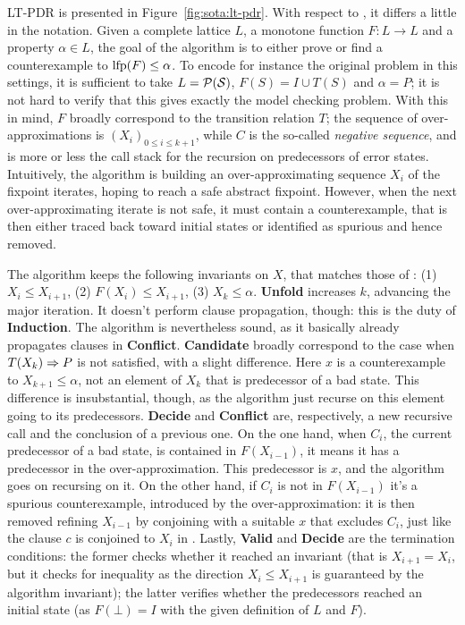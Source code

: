 LT-PDR is presented in Figure~\ref{fig:sota:lt-pdr}. With respect to , it differs a little in the notation. Given a complete lattice $L$, a monotone function $F: L \rightarrow L$ and a property $\alpha \in L$, the goal of the algorithm is to either prove or find a counterexample to $\text{lfp}(F) \le \alpha$. To encode for instance the original  problem in this settings, it is sufficient to take $L = \mathcal{P}(\mathcal{S})$, $F(S) = I \cup T(S)$ and $\alpha = P$; it is not hard to verify that this gives exactly the model checking problem.
With this in mind, $F$ broadly correspond to the transition relation $T$; the sequence of over-approximations is $( X_i )_{0 \le i \le k + 1}$, while $C$ is the so-called \emph{negative sequence}, and is more or less the call stack for the recursion on predecessors of error states.
Intuitively, the algorithm is building an over-approximating sequence $X_i$ of the fixpoint iterates, hoping to reach a safe abstract fixpoint. However, when the next over-approximating iterate is not safe, it must contain a counterexample, that is then either traced back toward initial states or identified as spurious and hence removed.

The algorithm keeps the following invariants on $X$, that matches those of : (1) $X_i \le X_{i+1}$, (2) $F(X_i) \le X_{i+1}$, (3) $X_k \le \alpha$.
\textbf{Unfold} increases $k$, advancing the major iteration. It doesn't perform clause propagation, though: this is the duty of \textbf{Induction}. The algorithm is nevertheless sound, as it basically already propagates clauses in \textbf{Conflict}.
\textbf{Candidate} broadly correspond to the case when $T(X_k) \Rightarrow P$ is not satisfied, with a slight difference. Here $x$ is a counterexample to $X_{k+1} \le \alpha$, not an element of $X_k$ that is predecessor of a bad state. This difference is insubstantial, though, as the algorithm just recurse on this element going to its predecessors.
\textbf{Decide} and \textbf{Conflict} are, respectively, a new recursive call and the conclusion of a previous one. On the one hand, when $C_i$, the current predecessor of a bad state, is contained in $F (X_{i-1})$, it means it has a predecessor in the over-approximation. This predecessor is $x$, and the algorithm goes on recursing on it. On the other hand, if $C_i$ is not in $F (X_{i-1})$ it's a spurious counterexample, introduced by the over-approximation: it is then removed refining $X_{i-1}$ by conjoining with a suitable $x$ that excludes $C_i$, just like the clause $c$ is conjoined to $X_i$ in .
Lastly, \textbf{Valid} and \textbf{Decide} are the termination conditions: the former checks whether it reached an invariant (that is $X_{i+1} = X_i$, but it checks for inequality as the direction $X_i \le X_{i+1}$ is guaranteed by the algorithm invariant); the latter verifies whether the predecessors reached an initial state (as $F(\bot) = I$ with the given definition of $L$ and $F$).

